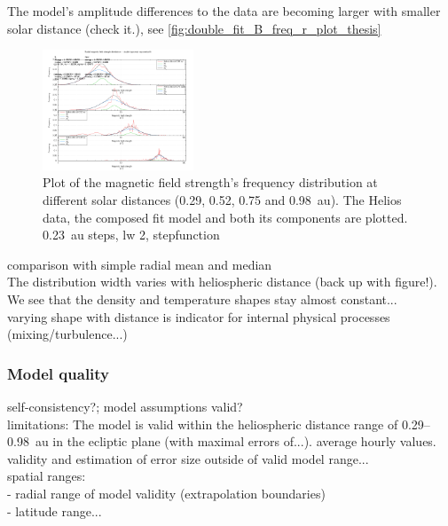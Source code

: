 The model's amplitude differences to the data are becoming larger with smaller solar distance (check it.), see \autoref{fig:double_fit_B_freq_r_plot_thesis}\\
\begin{figure}[htb]
	\centering
	\includegraphics[width=0.4\textwidth]{images/gnuplots/double_fit_B_freq_r_plot_thesis.png}
	\caption{Plot of the magnetic field strength's frequency distribution at different solar distances (0.29, 0.52, 0.75 and 0.98~au). The Helios data, the composed fit model and both its components are plotted. 0.23~au steps, lw 2, stepfunction}
	\label{fig:double_fit_B_freq_r_plot_thesis}
\end{figure}


comparison with simple radial mean and median\\

The distribution width varies with heliospheric distance (back up with figure!).\\

We see that the density and temperature shapes stay almost constant...\\

varying shape with distance is indicator for internal physical processes (mixing/turbulence...)\\


\subsubsection{Model quality}

self-consistency?; model assumptions valid?\\

limitations: The model is valid within the heliospheric distance range of 0.29--0.98~au in the ecliptic plane (with maximal errors of...). average hourly values.\\

validity and estimation of error size outside of valid model range...\\
spatial ranges:\\
- radial range of model validity (extrapolation boundaries)\\
- latitude range...\\

